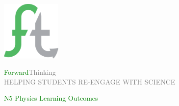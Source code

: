 \documentclass[12pt, a4paper, landscape, dvipsnames]{report}
\begin{document}

\begin{titlepage}
	\begin{center}
		\vspace*{3cm}
		\includegraphics[width=0.22\textwidth]{ftlogo} \\
		\vspace*{1cm}
        \begin{centering}
            {\fontsize{1.5cm}{1cm}\selectfont
            \textcolor{Green}{Forward}\textcolor{Gray}{Thinking}
            }\\
            \vspace*{0.5cm}
            {\fontsize{.5cm}{1cm}\selectfont
            \textcolor{Gray}{HELPING STUDENTS RE-ENGAGE WITH SCIENCE}
            }\\
        \end{centering}
		\vspace*{2cm}
        \begin{centering}
            {\fontsize{1.5cm}{1cm}\selectfont
            \textcolor{Green}{N5 Physics Learning Outcomes}
            }
        \end{centering}
	\end{center}
\end{titlepage}

\pagestyle{logo}






\end{document}
